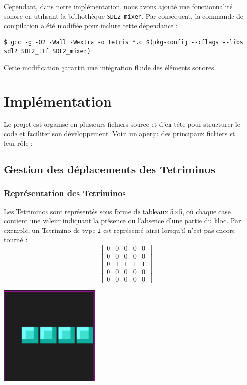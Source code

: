 \documentclass[12pt,a4paper]{report}
\begin{document}
Cependant, dans notre implémentation, nous avons ajouté une fonctionnalité sonore en utilisant la bibliothèque \texttt{SDL2\_mixer}. Par conséquent, la commande de compilation a été modifiée pour inclure cette dépendance :

\begin{lstlisting}
$ gcc -g -O2 -Wall -Wextra -o Tetris *.c $(pkg-config --cflags --libs sdl2 SDL2_ttf SDL2_mixer)
\end{lstlisting}

Cette modification garantit une intégration fluide des éléments sonores.

\newpage
\chapter{Implémentation}

Le projet est organisé en plusieurs fichiers source et d’en-tête pour structurer le code et faciliter son développement. Voici un aperçu des principaux fichiers et leur rôle :

\section{Gestion des déplacements des Tetriminos}

\subsection{Représentation des Tetriminos}
Les Tetriminos sont représentés sous forme de tableaux 5×5, où chaque case contient une valeur indiquant la présence ou l'absence d'une partie du bloc. Par exemple, un Tetrimino de type \texttt{I} est représenté ainsi lorsqu'il n'est pas encore tourné :
\[
\begin{bmatrix}
0 & 0 & 0 & 0 & 0 \\
0 & 0 & 0 & 0 & 0 \\
0 & 1 & 1 & 1 & 1 \\
0 & 0 & 0 & 0 & 0 \\
0 & 0 & 0 & 0 & 0
\end{bmatrix}
\]
\begin{center}
\includegraphics[scale=1]{Fegure_I_Tetris.png} 
\end{center}
\end{document}
